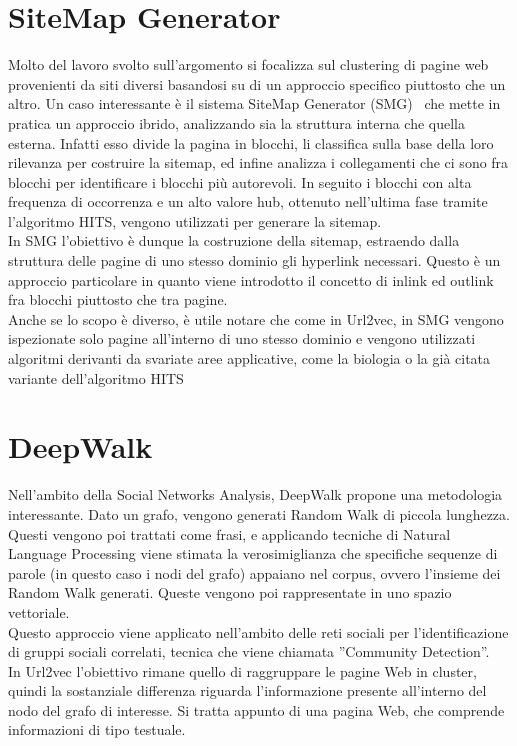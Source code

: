 \section{SiteMap Generator}
Molto del lavoro svolto sull'argomento si focalizza sul clustering di pagine web provenienti da siti diversi basandosi su di un approccio specifico piuttosto che un altro. Un caso interessante è il sistema SiteMap Generator (SMG)~\cite{Lin11} che mette in pratica un approccio ibrido, analizzando sia la struttura interna che quella esterna. Infatti esso divide la pagina in blocchi, li classifica sulla base della loro rilevanza per costruire la sitemap, ed infine analizza i collegamenti che ci sono fra blocchi per identificare i blocchi più autorevoli. In seguito i blocchi con alta frequenza di occorrenza e un alto valore hub, ottenuto nell'ultima fase tramite l'algoritmo HITS, vengono utilizzati per generare la sitemap.
\\
In SMG l'obiettivo è dunque la costruzione della sitemap, estraendo dalla struttura delle pagine di uno stesso dominio gli hyperlink necessari. Questo è un approccio particolare in quanto viene introdotto il concetto di inlink ed outlink fra blocchi piuttosto che tra pagine. 
\\
Anche se lo scopo è diverso, è utile notare che come in Url2vec, in SMG vengono ispezionate solo pagine all'interno di uno stesso dominio e vengono utilizzati algoritmi derivanti da svariate aree applicative, come la biologia o la già citata variante dell'algoritmo HITS \cite{Kleinberg99}

\section{DeepWalk}
Nell'ambito della Social Networks Analysis, DeepWalk \cite{Perozzi14} propone una metodologia interessante. Dato un grafo, vengono generati Random Walk di piccola lunghezza. Questi vengono poi trattati come frasi, e applicando tecniche di Natural Language Processing viene stimata la verosimiglianza che specifiche sequenze di parole (in questo caso i nodi del grafo) appaiano nel corpus, ovvero l'insieme dei Random Walk generati. Queste vengono poi rappresentate in uno spazio vettoriale.
\\
Questo approccio viene applicato nell'ambito delle reti sociali per l'identificazione di gruppi sociali correlati, tecnica che viene chiamata ''Community Detection''.
\\
In Url2vec l'obiettivo rimane quello di raggruppare le pagine Web in cluster, quindi la sostanziale differenza riguarda l'informazione presente all'interno del nodo del grafo di interesse. Si tratta appunto di una pagina Web, che comprende informazioni di tipo testuale. 
